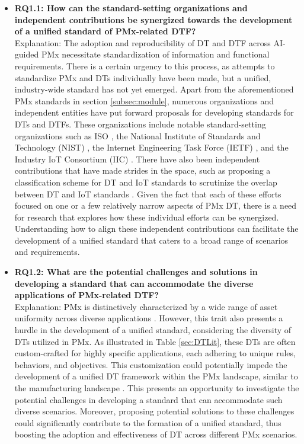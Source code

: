 \documentclass[runningheads]{llncs}
\begin{document}
\begin{itemize}
\item \textbf{RQ1.1: How can the standard-setting organizations and independent contributions be synergized towards the development of a unified standard of PMx-related DTF?} \\
Explanation: The adoption and reproducibility of DT and DTF across AI-guided PMx necessitate standardization of information and functional requirements. There is a certain urgency to this process, as attempts to standardize PMx and DTs individually have been made, but a unified, industry-wide standard has not yet emerged. Apart from the aforementioned PMx standards in section \ref{subsec:module}, numerous organizations and independent entities have put forward proposals for developing standards for DTs and DTFs. These organizations include notable standard-setting organizations such as ISO \cite{ISO23247}, the National Institute of Standards and Technology (NIST) \cite{NIST8356}, the Internet Engineering Task Force (IETF) \cite{IETF}, and the Industry IoT Consortium (IIC) \cite{IIC}. There have also been independent contributions that have made strides in the space, such as proposing a classification scheme for DT and IoT standards to scrutinize the overlap between DT and IoT standards \cite{jacoby2020digital}. Given the fact that each of these efforts focused on one or a few relatively narrow aspects of PMx DT, there is a need for research that explores how these individual efforts can be synergized. Understanding how to align these independent contributions can facilitate the development of a unified standard that caters to a broad range of scenarios and requirements.
\item \textbf{RQ1.2: What are the potential challenges and solutions in developing a standard that can accommodate the diverse applications of PMx-related DTF?} \\
Explanation: PMx is distinctively characterized by a wide range of asset uniformity across diverse applications \cite{ma2023twin}. However, this trait also presents a hurdle in the development of a unified standard, considering the diversity of DTs utilized in PMx. As illustrated in Table \ref{sec:DTLit}, these DTs are often custom-crafted for highly specific applications, each adhering to unique rules, behaviors, and objectives. This customization could potentially impede the development of a unified DT framework within the PMx landscape, similar to the manufacturing landscape \cite{KAMBLE2022121448}. This presents an opportunity to investigate the potential challenges in developing a standard that can accommodate such diverse scenarios. Moreover, proposing potential solutions to these challenges could significantly contribute to the formation of a unified standard, thus boosting the adoption and effectiveness of DT across different PMx scenarios.

\end{itemize}
\end{document}
